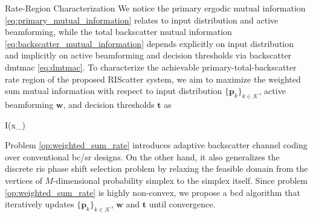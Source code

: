 \documentclass[journal]{IEEEtran}
\begin{document}
\begin{section}{Rate-Region Characterization}
	We notice the primary ergodic mutual information \eqref{eq:primary_mutual_information} relates to input distribution and active beamforming, while the total backscatter mutual information \eqref{eq:backscatter_mutual_information} depends explicitly on input distribution and implicitly on active beamforming and decision thresholds via backscatter \gls{dmtmac} \eqref{eq:dmtmac}.
	To characterize the achievable primary-total-backscatter rate region of the proposed RIScatter system, we aim to maximize the weighted sum mutual information with respect to input distribution $\{\boldsymbol{p}_k\}_{k \in \mathcal{K}}$, active beamforming $\boldsymbol{w}$, and decision thresholds $\boldsymbol{t}$ as
	\begin{maxi!}
		{}{I(x_{})}{\label{op:weighted_sum_rate}}{\label{ob:weighted_sum_rate}}
	\end{maxi!}

	Problem \eqref{op:weighted_sum_rate} introduces adaptive backscatter channel coding over conventional \gls{bc}/\gls{sr} designs.
	On the other hand, it also generalizes the discrete \gls{ris} phase shift selection problem by relaxing the feasible domain from the vertices of $M$-dimensional probability simplex to the simplex itself.
	Since problem \eqref{op:weighted_sum_rate} is highly non-convex, we propose a \gls{bcd} algorithm that iteratively updates $\{\boldsymbol{p}_k\}_{k \in \mathcal{K}}$, $\boldsymbol{w}$ and $\boldsymbol{t}$ until convergence.


\end{section}
\end{document}
